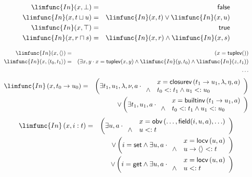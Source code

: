 \documentclass[12pt]{article}
\begin{document}
\begin{eqnarray*}
\limfunc{In}(x,\bot ) &=&\mathsf{false} \\
\limfunc{In}(x,t\sqcup u) &=&\limfunc{In}(x,t)\vee \limfunc{In}(x,u) \\
\limfunc{In}(x,\top ) &=&\mathsf{true} \\
\limfunc{In}(x,r\sqcap s) &=&\limfunc{In}(x,r)\wedge \limfunc{In}(x,s)
\end{eqnarray*}

\begin{eqnarray*}
\limfunc{In}(x,\left\langle {}\right\rangle ) &=&\left( x=\mathsf{tuplev}%
()\right) \\
\limfunc{In}(x,\left\langle t_{0},t_{1}\right\rangle ) &=&\left( \exists
x,y\cdot x=\mathsf{tuplev}(x,y)\wedge \limfunc{In}(y,t_{0})\wedge \limfunc{In%
}(z,t_{1})\right) \\
&&\ldots
\end{eqnarray*}%
\begin{eqnarray*}
\limfunc{In}\left( x,t_{0}\rightarrow u_{0}\right) &=&\left( \exists
t_{1},u_{1},\lambda ,\nu ,a\cdot 
\begin{array}{ll}
& x=\mathsf{closurev}\left( t_{1}\rightarrow u_{1},\lambda ,\eta ,a\right)
\\ 
\wedge & t_{0}<:t_{1}\wedge u_{1}<:u_{0}%
\end{array}%
\right) \\
&&\vee \left( \exists t_{1},u_{1},a\cdot 
\begin{array}{ll}
& x=\mathsf{builtinv}\left( t_{1}\rightarrow u_{1},a\right) \\ 
\wedge & t_{0}<:t_{1}\wedge u_{1}<:u_{0}%
\end{array}%
\right)
\end{eqnarray*}%
\begin{eqnarray*}
\limfunc{In}\left( x,i:t\right) &=&\left( \exists u,a\cdot 
\begin{array}{ll}
& x=\mathsf{obv}\left( \ldots ,\mathsf{field}(i,u,a),\ldots \right) \\ 
\wedge & u<:t%
\end{array}%
\right) \\
&&\vee \left( i=\mathsf{set}\wedge \exists u,a\cdot 
\begin{array}{ll}
& x=\mathsf{locv}\left( u,a\right) \\ 
\wedge & u\rightarrow \left\langle {}\right\rangle <:t%
\end{array}%
\right) \\
&&\vee \left( i=\mathsf{get}\wedge \exists u,a\cdot 
\begin{array}{ll}
& x=\mathsf{locv}\left( u,a\right) \\ 
\wedge & u<:t%
\end{array}%
\right)
\end{eqnarray*}%
\end{document}
